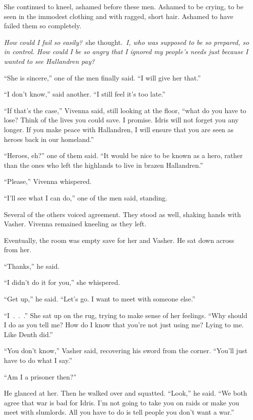 She continued to kneel, ashamed before these men. Ashamed to be crying, to be seen in the immodest clothing and with ragged, short hair. Ashamed to have failed them so completely.

\textit{How could I fail so easily?}~she thought.~\textit{I, who was supposed to be so prepared, so in control. How could I be so angry that I ignored my people’s needs just because I wanted to see Hallandren pay?}

“She is sincere,” one of the men finally said. “I will give her that.”

“I don’t know,” said another. “I still feel it’s too late.”

“If that’s the case,” Vivenna said, still looking at the floor, “what do you have to lose? Think of the lives you could save. I promise. Idris will not forget you any longer. If you make peace with Hallandren, I will ensure that you are seen as heroes back in our homeland.”

“Heroes, eh?” one of them said. “It would be nice to be known as a hero, rather than the ones who left the highlands to live in brazen Hallandren.”

“Please,” Vivenna whispered.

“I’ll see what I can do,” one of the men said, standing.

Several of the others voiced agreement. They stood as well, shaking hands with Vasher. Vivenna remained kneeling as they left.

Eventually, the room was empty save for her and Vasher. He sat down across from her.

“Thanks,” he said.

“I didn’t do it for you,” she whispered.

“Get up,” he said. “Let’s go. I want to meet with someone else.”

“I~.~.~.” She sat up on the rug, trying to make sense of her feelings. “Why should I do as you tell me? How do I know that you’re not just using me? Lying to me. Like Denth did.”

“You don’t know,” Vasher said, recovering his sword from the corner. “You’ll just have to do what I say.”

“Am I a prisoner then?”

He glanced at her. Then he walked over and squatted. “Look,” he said. “We both agree that war is bad for Idris. I’m not going to take you on raids or make you meet with slumlords. All you have to do is tell people you don’t want a war.”

